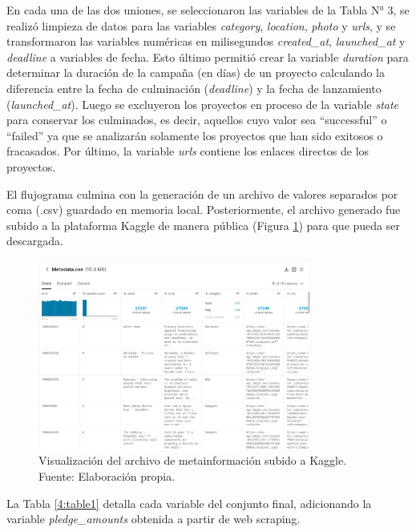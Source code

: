 En cada una de las dos uniones, se seleccionaron las variables de la Tabla N° 3, se realizó limpieza de datos para las variables \textit{category}, \textit{location}, \textit{photo} y \textit{urls}, y se transformaron las variables numéricas en milisegundos \textit{created\_at}, \textit{launched\_at} y \textit{deadline} a variables de fecha. Esto último permitió crear la variable \textit{duration} para determinar la duración de la campaña (en días) de un proyecto calculando la diferencia entre la fecha de culminación (\textit{deadline}) y la fecha de lanzamiento (\textit{launched\_at}). Luego se excluyeron los proyectos en proceso de la variable \textit{state} para conservar los culminados, es decir, aquellos cuyo valor sea “successful” o “failed” ya que se analizarán solamente los proyectos que han sido exitosos o fracasados. Por último, la variable \textit{urls} contiene los enlaces directos de los proyectos.

El flujograma culmina con la generación de un archivo de valores separados por coma (.csv) guardado en memoria local. Posteriormente, el archivo generado fue subido a la plataforma Kaggle de manera pública (Figura \ref{4:fig5}) para que pueda ser descargada.

\begin{figure}[h]
	\begin{center}
		\includegraphics[width=0.8\textwidth]{4/figures/metadata_kaggle_preview.jpg}
		\caption{Visualización del archivo de metainformación subido a Kaggle. Fuente: Elaboración propia.}
		\label{4:fig5}
	\end{center}
\end{figure}

La Tabla \ref{4:table1} detalla cada variable del conjunto final, adicionando la variable \textit{pledge\_amounts} obtenida a partir de web scraping.


